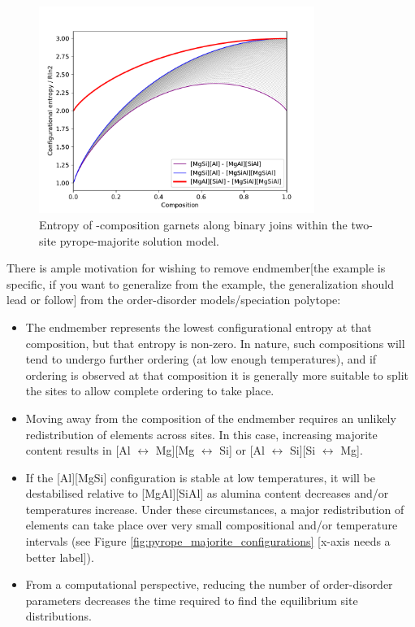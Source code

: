 \documentclass[preprint,12pt]{elsarticle}
\begin{document}
\begin{figure}[htb!]
  \centering
  \includegraphics[width=0.80\textwidth]{figures/py_maj_entropy.pdf}
  \caption{Entropy of -composition garnets along binary joins within the two-site pyrope-majorite solution model.}
  \label{fig:pyrope_majorite_entropy}
\end{figure}

There is ample motivation for wishing to remove endmember[the example is specific, if you want to generalize from the example, the generalization should lead or follow]  from the order-disorder models/speciation polytope:
\begin{itemize}
    \item The endmember represents the lowest configurational entropy at that composition, but that entropy is non-zero. In nature, such compositions will tend to undergo further ordering (at low enough temperatures), and if ordering is observed at that composition it is generally more suitable to split the sites to allow complete ordering to take place.
    \item Moving away from the composition of the  endmember requires an unlikely redistribution of elements across sites. In this case, increasing majorite content results in [Al $\leftrightarrow$ Mg][Mg $\leftrightarrow$ Si] or [Al $\leftrightarrow$ Si][Si $\leftrightarrow$ Mg]. 
    \item If the [Al][MgSi] configuration is stable at low temperatures, it will be destabilised relative to [MgAl][SiAl] as alumina content decreases and/or temperatures increase. Under these circumstances, a major redistribution of elements can take place over very small compositional and/or temperature intervals (see Figure \ref{fig:pyrope_majorite_configurations} [x-axis needs a better label]). 
    \item From a computational perspective, reducing the number of order-disorder parameters decreases the time required to find the equilibrium site distributions.
\end{itemize}
\end{document}
